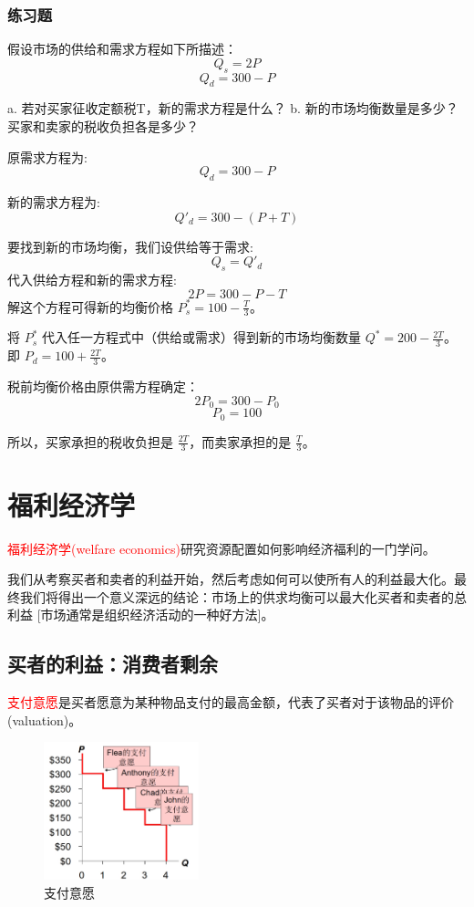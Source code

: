 \documentclass[12pt, a4paper]{article}
\begin{document}
\subsubsection{练习题}
假设市场的供给和需求方程如下所描述：
\[ Q_s = 2P \]
\[ Q_d = 300 - P \]

a. 若对买家征收定额税T，新的需求方程是什么？
b. 新的市场均衡数量是多少？买家和卖家的税收负担各是多少？

原需求方程为: 
\[ Q_d = 300 - P \]

新的需求方程为: 
\[ Q'_d = 300 - (P + T) \]

要找到新的市场均衡，我们设供给等于需求:
\[ Q_s = Q'_d \]
代入供给方程和新的需求方程:
\[ 2P = 300 - P - T \]
解这个方程可得新的均衡价格 \( P_s^* = 100 - \frac{T}{3} \)。

将 \( P_s^* \) 代入任一方程式中（供给或需求）得到新的市场均衡数量 \( Q^* = 200 - \frac{2T}{3} \)。即 \( P_d = 100 + \frac{2T}{3} \)。

税前均衡价格由原供需方程确定：
\[ 2P_0 = 300 - P_0 \]
\[ P_0 = 100 \]

所以，买家承担的税收负担是 \( \frac{2T}{3} \)，而卖家承担的是 \( \frac{T}{3} \)。







\newpage
\section{福利经济学}
\textcolor{red}{福利经济学(welfare economics)}研究资源配置如何影响经济福利的一门学问。

我们从考察买者和卖者的利益开始，然后考虑如何可以使所有人的利益最大化。最终我们将得出一个意义深远的结论：市场上的供求均衡可以最大化买者和卖者的总利益 [市场通常是组织经济活动的一种好方法]。

\subsection{买者的利益：消费者剩余}
\textcolor{red}{支付意愿}是买者愿意为某种物品支付的最高金额，代表了买者对于该物品的评价(valuation)。

\begin{figure}[H]
  \centering
  \includegraphics[width=0.4\textwidth]{支付意愿.png}
  \caption{支付意愿}
\end{figure}
\end{document}
